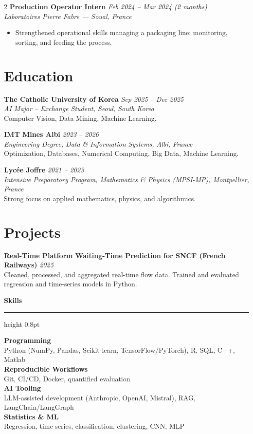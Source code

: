 \documentclass[10.5pt,a4paper]{article}
\newcommand{\sectionrule}{\vspace{-6pt}{\color{accent}\hrule height 1pt}\vspace{7pt}}
\newcommand{\subsectitle}[1]{%
  {\color{accent}\bfseries\large #1}\\[-2pt]
  {\color{accent}\hrule height 0.8pt}\vspace{7pt}
}
\newcommand{\cvexp}[5]{%
  \noindent\textbf{#1} \hfill {\itshape\color{graytext}\small #4}\\
  {\itshape #2 --- #3}\\[-2pt]
  #5
  \vspace{9pt}
}
\newcommand{\cvedu}[5]{%
  \noindent\textbf{#1} \hfill {\itshape\color{graytext}\small #4}\\
  {\itshape #2, #3}\\[1pt]
  {\small #5}
  \vspace{6pt}
}
\newcommand{\cvproject}[3]{%
  \noindent\textbf{#1} \hfill {\itshape\color{graytext}\small #2}\\[1pt]
  {\small #3}
  \vspace{5pt}
}
\newcommand{\sidebarline}[2]{%
  \noindent\textbf{\small #1}\\
  {\small #2}\\[3pt]
}
\begin{document}
\begin{paracol}{2}
\cvexp{Production Operator Intern}{Laboratoires Pierre Fabre}{Soual, France}{Feb 2024 -- Mar 2024 (2 months)}{%
  \begin{itemize}[leftmargin=12pt, itemsep=2pt, topsep=0pt, partopsep=0pt, parsep=0pt]
    \item Strengthened operational skills managing a packaging line: monitoring, sorting, and feeding the process.
  \end{itemize}
}

\section*{Education}
\sectionrule

\cvedu{The Catholic University of Korea}{AI Major -- Exchange Student}{Seoul, South Korea}{Sep 2025 -- Dec 2025}{Computer Vision, Data Mining, Machine Learning.}

\cvedu{IMT Mines Albi}{Engineering Degree, Data \& Information Systems}{Albi, France}{2023 -- 2026}{Optimization, Databases, Numerical Computing, Big Data, Machine Learning.}

\cvedu{Lycée Joffre}{Intensive Preparatory Program, Mathematics \& Physics (MPSI-MP)}{Montpellier, France}{2021 -- 2023}{Strong focus on applied mathematics, physics, and algorithmics.}

\section*{Projects}
\sectionrule

\cvproject{Real-Time Platform Waiting-Time Prediction for SNCF (French Railways)}{2025}{Cleaned, processed, and aggregated real-time flow data. Trained and evaluated regression and time-series models in Python.}

\switchcolumn

\vspace{-1pt}

\subsectitle{Skills}

\sidebarline{Programming}{Python (NumPy, Pandas, Scikit-learn, TensorFlow/\allowbreak PyTorch), R, SQL, C++, Matlab}
\sidebarline{Reproducible Workflows}{Git, CI/CD, Docker, quantified evaluation}
\sidebarline{AI Tooling}{LLM-assisted development (Anthropic, OpenAI, Mistral), RAG, LangChain/\allowbreak LangGraph}
\sidebarline{Statistics \& ML}{Regression, time series, classification, clustering, CNN, MLP}


\end{paracol}
\end{document}
